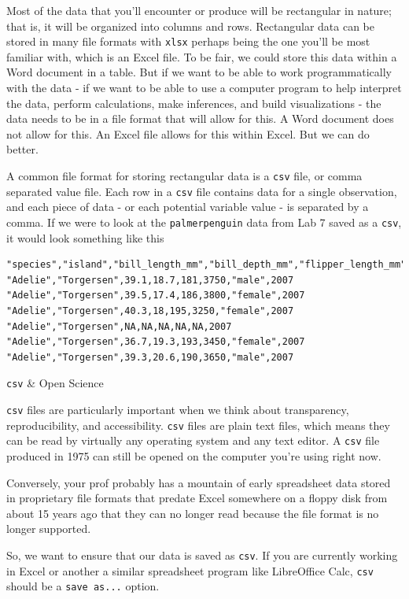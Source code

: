 \documentclass[
]{book}
\begin{document}
Most of the data that you'll encounter or produce will be rectangular in nature; that is, it will be organized into columns and rows. Rectangular data can be stored in many file formats with \texttt{xlsx} perhaps being the one you'll be most familiar with, which is an Excel file. To be fair, we could store this data within a Word document in a table. But if we want to be able to work programmatically with the data - if we want to be able to use a computer program to help interpret the data, perform calculations, make inferences, and build visualizations - the data needs to be in a file format that will allow for this. A Word document does not allow for this. An Excel file allows for this within Excel. But we can do better.

A common file format for storing rectangular data is a \texttt{csv} file, or comma separated value file. Each row in a \texttt{csv} file contains data for a single observation, and each piece of data - or each potential variable value - is separated by a comma. If we were to look at the \texttt{palmerpenguin} data from Lab 7 saved as a \texttt{csv}, it would look something like this

\begin{verbatim}
"species","island","bill_length_mm","bill_depth_mm","flipper_length_mm","body_mass_g","sex","year"
"Adelie","Torgersen",39.1,18.7,181,3750,"male",2007
"Adelie","Torgersen",39.5,17.4,186,3800,"female",2007
"Adelie","Torgersen",40.3,18,195,3250,"female",2007
"Adelie","Torgersen",NA,NA,NA,NA,NA,2007
"Adelie","Torgersen",36.7,19.3,193,3450,"female",2007
"Adelie","Torgersen",39.3,20.6,190,3650,"male",2007
\end{verbatim}

\texttt{csv} \& Open Science

\texttt{csv} files are particularly important when we think about transparency, reproducibility, and accessibility. \texttt{csv} files are plain text files, which means they can be read by virtually any operating system and any text editor. A \texttt{csv} file produced in 1975 can still be opened on the computer you're using right now.

Conversely, your prof probably has a mountain of early spreadsheet data stored in proprietary file formats that predate Excel somewhere on a floppy disk from about 15 years ago that they can no longer read because the file format is no longer supported.

So, we want to ensure that our data is saved as \texttt{csv}. If you are currently working in Excel or another a similar spreadsheet program like LibreOffice Calc, \texttt{csv} should be a \texttt{save\ as...} option.
\end{document}
